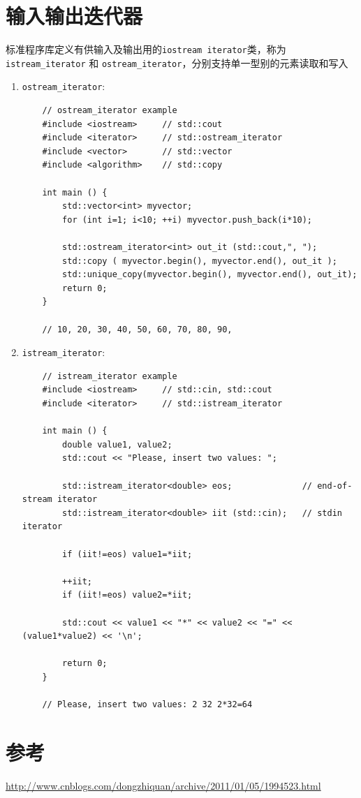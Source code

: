 \documentclass[UTF8,a4paper,12pt]{ctexbook}
\begin{document}
	\section{输入输出迭代器}
		标准程序库定义有供输入及输出用的\verb|iostream iterator|类，称为 \verb|istream_iterator| 和 \verb|ostream_iterator|，分别支持单一型别的元素读取和写入	
		
		\begin{enumerate}
			\item \verb|ostream_iterator|:
				\begin{lstlisting}
	// ostream_iterator example
	#include <iostream>     // std::cout
	#include <iterator>     // std::ostream_iterator
	#include <vector>       // std::vector
	#include <algorithm>    // std::copy
	
	int main () {
		std::vector<int> myvector;
		for (int i=1; i<10; ++i) myvector.push_back(i*10);
		
		std::ostream_iterator<int> out_it (std::cout,", ");
		std::copy ( myvector.begin(), myvector.end(), out_it );
		std::unique_copy(myvector.begin(), myvector.end(), out_it);
		return 0;
	}
	
	// 10, 20, 30, 40, 50, 60, 70, 80, 90, 
				\end{lstlisting}
			\item \verb|istream_iterator|:
			\begin{lstlisting}
	// istream_iterator example
	#include <iostream>     // std::cin, std::cout
	#include <iterator>     // std::istream_iterator
	
	int main () {
		double value1, value2;
		std::cout << "Please, insert two values: ";
		
		std::istream_iterator<double> eos;              // end-of-stream iterator
		std::istream_iterator<double> iit (std::cin);   // stdin iterator
		
		if (iit!=eos) value1=*iit;
		
		++iit;
		if (iit!=eos) value2=*iit;
		
		std::cout << value1 << "*" << value2 << "=" << (value1*value2) << '\n';
		
		return 0;
	}
	
	// Please, insert two values: 2 32 2*32=64
			\end{lstlisting}
		\end{enumerate}	
\section{参考}
		\url{http://www.cnblogs.com/dongzhiquan/archive/2011/01/05/1994523.html}
		
\end{document}
